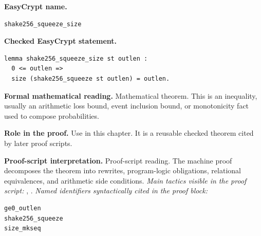\begin{formaltheorem}
\noindent\textbf{EasyCrypt name.}
\begin{lstlisting}[language=EasyCrypt,basicstyle=\ttfamily\scriptsize]
shake256_squeeze_size
\end{lstlisting}
\noindent\textbf{Checked EasyCrypt statement.}
\begin{lstlisting}[language=EasyCrypt,basicstyle=\ttfamily\scriptsize]
lemma shake256_squeeze_size st outlen :
  0 <= outlen =>
  size (shake256_squeeze st outlen) = outlen.
\end{lstlisting}
\noindent\textbf{Formal mathematical reading.}
Mathematical theorem. This is an inequality, usually an arithmetic loss bound, event inclusion bound, or monotonicity fact used to compose probabilities.

\noindent\textbf{Role in the proof.}
Use in this chapter. It is a reusable checked theorem cited by later proof scripts.

\noindent\textbf{Proof-script interpretation.}
Proof-script reading. The machine proof decomposes the theorem into rewrites, program-logic obligations, relational equivalences, and arithmetic side conditions.
\emph{Main tactics visible in the proof script:} , .
\emph{Named identifiers syntactically cited in the proof block:}
\begin{lstlisting}[language=EasyCrypt,basicstyle=\ttfamily\scriptsize]
ge0_outlen
shake256_squeeze
size_mkseq
\end{lstlisting}

\end{formaltheorem}

